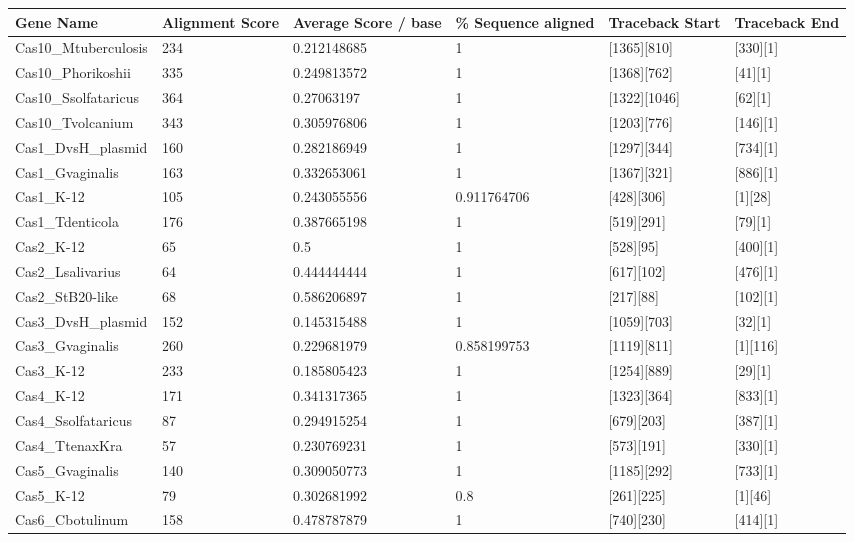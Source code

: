 \documentclass[11pt, oneside]{article}
\begin{document}
\begin{minipage}{\linewidth}
\smallskip
\centering
{} \label{sgoutput} 
\begin{tabular}{ p{1.25in} C{.85in} *4{C{.75in}}}\toprule[1.5pt]
\bf Gene Name & \bf Alignment Score & \bf Average Score / base & \bf \% Sequence aligned & \bf Traceback Start & \bf Traceback End\\\midrule
Cas10\_Mtuberculosis & 234 & 0.212148685 & 1 & [1365][810] & [330][1]\\ 
Cas10\_Phorikoshii & 335 & 0.249813572 & 1 & [1368][762] & [41][1]\\ 
Cas10\_Ssolfataricus & 364 & 0.27063197 & 1 & [1322][1046] & [62][1]\\ 
Cas10\_Tvolcanium & 343 & 0.305976806 & 1 & [1203][776] & [146][1]\\ 
Cas1\_DvsH\_plasmid & 160 & 0.282186949 & 1 & [1297][344] & [734][1]\\ 
Cas1\_Gvaginalis & 163 & 0.332653061 & 1 & [1367][321] & [886][1]\\ 
Cas1\_K-12 & 105 & 0.243055556 & 0.911764706 & [428][306] & [1][28]\\ 
Cas1\_Tdenticola & 176 & 0.387665198 & 1 & [519][291] & [79][1]\\ 
Cas2\_K-12 & 65 & 0.5 & 1 & [528][95] & [400][1]\\ 
Cas2\_Lsalivarius & 64 & 0.444444444 & 1 & [617][102] & [476][1]\\ 
Cas2\_StB20-like & 68 & 0.586206897 & 1 & [217][88] & [102][1]\\ 
Cas3\_DvsH\_plasmid & 152 & 0.145315488 & 1 & [1059][703] & [32][1]\\ 
Cas3\_Gvaginalis & 260 & 0.229681979 & 0.858199753 & [1119][811] & [1][116]\\ 
Cas3\_K-12 & 233 & 0.185805423 & 1 & [1254][889] & [29][1]\\ 
Cas4\_K-12 & 171 & 0.341317365 & 1 & [1323][364] & [833][1]\\ 
Cas4\_Ssolfataricus & 87 & 0.294915254 & 1 & [679][203] & [387][1]\\ 
Cas4\_TtenaxKra & 57 & 0.230769231 & 1 & [573][191] & [330][1]\\ 
Cas5\_Gvaginalis & 140 & 0.309050773 & 1 & [1185][292] & [733][1]\\ 
Cas5\_K-12 & 79 & 0.302681992 & 0.8 & [261][225] & [1][46]\\ 
Cas6\_Cbotulinum & 158 & 0.478787879 & 1 & [740][230] & [414][1]\\ 

\end{tabular}
\end{minipage}
\end{document}
